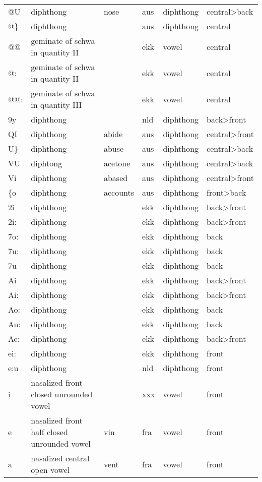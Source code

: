 {\begin{longtable}{l|p{.3\linewidth}|p{.15\linewidth}|l|p{.15\linewidth}|l}
	@U	& diphthong	& nose	& aus	& diphthong	& central\textgreater back	\\
	@\}	& diphthong	& 	& aus	& diphthong	& central	\\
	@@	& geminate of schwa in quantity II	& 	& ekk	& vowel	& central	\\
	@:	& geminate of schwa in quantity II	& 	& ekk	& vowel	& central	\\
	@@:	& geminate of schwa in quantity III	& 	& ekk	& vowel	& central	\\
	9y	& diphthong	& 	& nld	& diphthong	& back\textgreater front	\\
	QI	& diphthong	& abide	& aus	& diphthong	& central\textgreater front	\\
	U\}	& diphthong	& abuse	& aus	& diphthong	& central\textgreater back	\\
	VU	& diphtong	& acetone	& aus	& diphthong	& central\textgreater back	\\
	Vi	& diphthong	& abased	& aus	& diphthong	& central\textgreater front	\\
	\{o	& diphthong	& accounts	& aus	& diphthong	& front\textgreater back	\\
	2i	& diphthong	& 	& ekk	& diphthong	& back\textgreater front	\\
	2i:	& diphthong	& 	& ekk	& diphthong	& back\textgreater front	\\
	7o:	& diphthong	& 	& ekk	& diphthong	& back	\\
	7u:	& diphthong	& 	& ekk	& diphthong	& back	\\
	7u	& diphthong	& 	& ekk	& diphthong	& back	\\
	Ai	& diphthong	& 	& ekk	& diphthong	& back\textgreater front	\\
	Ai:	& diphthong	& 	& ekk	& diphthong	& back\textgreater front	\\
	Ao:	& diphthong	& 	& ekk	& diphthong	& back	\\
	Au:	& diphthong	& 	& ekk	& diphthong	& back	\\
	Ae:	& diphthong	& 	& ekk	& diphthong	& back\textgreater front	\\
	ei:	& diphthong	& 	& ekk	& diphthong	& front	\\
	e:u	& diphthong	& 	& nld	& diphthong	& front	\\
	i~	& nasalized front closed unrounded vowel	& 	& xxx	& vowel	& front	\\
	e~	& nasalized front half closed unrounded vowel	& vin	& fra	& vowel	& front	\\
	a~	& nasalized central open vowel	& vent	& fra	& vowel	& front	\\

\end{longtable}}
